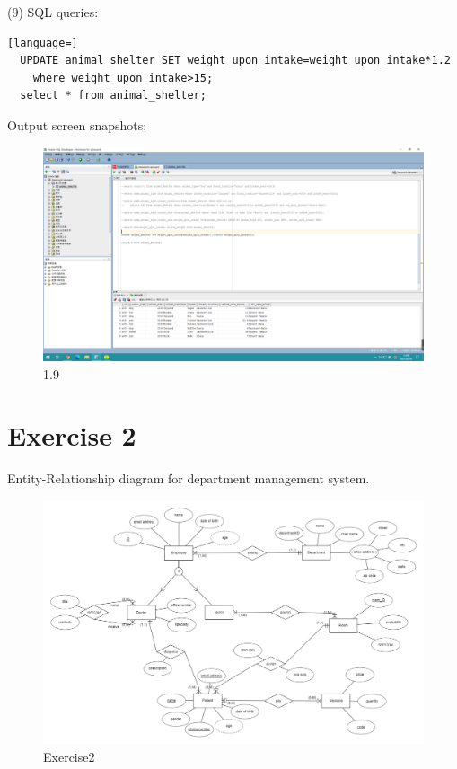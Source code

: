 \documentclass[]{article}
\begin{document}
(9) SQL queries:
	\begin{lstlisting}[language=] 
  UPDATE animal_shelter SET weight_upon_intake=weight_upon_intake*1.2
    where weight_upon_intake>15;
  select * from animal_shelter;
	\end{lstlisting} 
	Output screen snapshots:
	\begin{figure}[H]
		\centering
		\includegraphics[width=0.90\linewidth]{./document-H1/exercise1/1.9}
		\caption{1.9}
		\label{1.9}
	\end{figure}

\clearpage
\section{Exercise 2}

Entity-Relationship diagram for department management system.
\begin{figure}[H]
	\centering
	\includegraphics[width=1.13\linewidth]{./document-H1/Homework1-exercise2}
	\caption{Exercise2}
	\label{fig:homework1-exercise2}
\end{figure}
\end{document}
